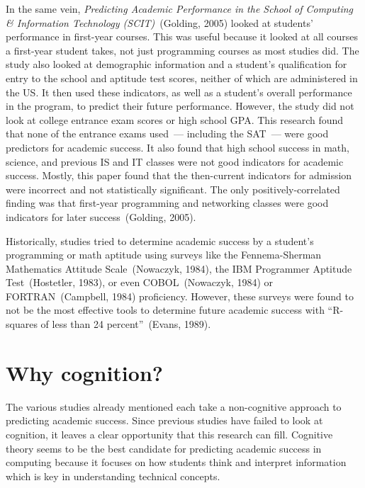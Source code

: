 In the same vein, \textit{Predicting Academic Performance in the School of Computing \& Information Technology (SCIT)}~(Golding, 2005) looked at students' performance in first-year courses. This was useful because it looked at all courses a first-year student takes, not just programming courses as most studies did. The study also looked at demographic information and a student's qualification for entry to the school and aptitude test scores, neither of which are administered in the US. It then used these indicators, as well as a student's overall performance in the program, to predict their future performance. However, the study did not look at college entrance exam scores or high school GPA. This research found that none of the entrance exams used~--- including the SAT~--- were good predictors for academic success. It also found that high school success in math, science, and previous IS and IT classes were not good indicators for academic success. Mostly, this paper found that the then-current indicators for admission were incorrect and not statistically significant. The only positively-correlated finding was that first-year programming and networking classes were good indicators for later success~(Golding, 2005).

Historically, studies tried to determine academic success by a student's programming or math aptitude using surveys like the Fennema-Sherman Mathematics Attitude Scale~(Nowaczyk, 1984), the IBM Programmer Aptitude Test~(Hostetler, 1983), or even COBOL~(Nowaczyk, 1984) or FORTRAN~(Campbell, 1984) proficiency. However, these surveys were found to not be the most effective tools to determine future academic success with ``R-squares of less than 24 percent''~(Evans, 1989).

\section{Why cognition?}
The various studies already mentioned each take a non-cognitive approach to predicting academic success. Since previous studies have failed to look at cognition, it leaves a clear opportunity that this research can fill. Cognitive theory seems to be the best candidate for predicting academic success in computing because it focuses on how students think and interpret information which is key in understanding technical concepts.

